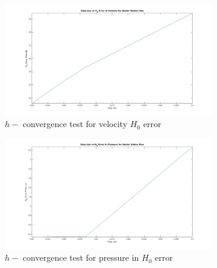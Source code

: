 \documentclass[a4paper]{book}
\begin{document}
\begin{figure}
\begin{subfigure}{\textwidth}	
  \includegraphics[width=\linewidth]{H0_convergence_velocity_n_s.jpg}
  \caption{$h-$ convergence test for velocity $H_0$ error}
  \label{fig:vel_navier_stoke_conv_h0}
\end{subfigure}
\begin{subfigure}{\textwidth}	
  \includegraphics[width=\linewidth]{H0_convergence_pressure_n_s.jpg}
  \caption{$h-$ convergence test for pressure in $H_0$ error}
  \label{fig:pre_navier_stoke_conv_h0}
\end{subfigure}
\caption{\label{navier_stoke_conv_h0}}
\end{figure}
\end{document}
